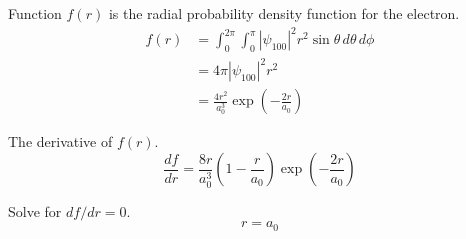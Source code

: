 


Function $f(r)$ is the radial probability density function for the electron.
\begin{align*}
f(r)&=\int_0^{2\pi}\int_0^\pi|\psi_{100}|^2r^2\sin\theta\,d\theta\,d\phi
\\
&=4\pi|\psi_{100}|^2r^2
\\
&=\frac{4r^2}{a_0^3}\exp\left(-\frac{2r}{a_0}\right)\tag{1}
\end{align*}

The derivative of $f(r)$.
\begin{equation*}
\frac{df}{dr}=\frac{8r}{a_0^3}\left(1-\frac{r}{a_0}\right)\exp\left(-\frac{2r}{a_0}\right)\tag{2}
\end{equation*}

Solve for $df/dr=0$.
\begin{equation*}
r=a_0
\end{equation*}



